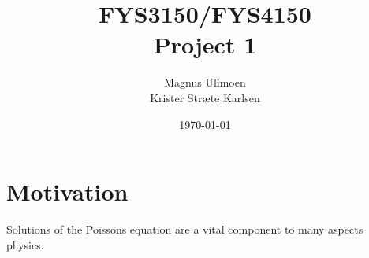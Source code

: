 \documentclass[11pt,a4paper,english]{article}
\title{FYS3150/FYS4150 \\Project 1}
\author{Magnus Ulimoen\\Krister Stræte Karlsen}
\date{\today}
\begin{document}
\maketitle

\section{Motivation}

Solutions of the Poissons equation are a vital component to many aspects physics.
\end{document}
